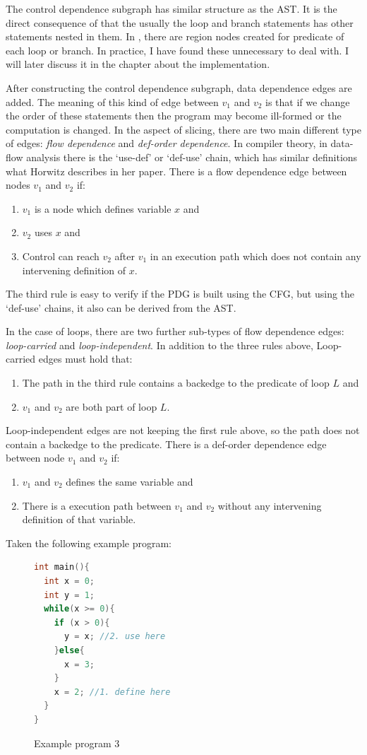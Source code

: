 \documentclass[oneside,12pt,a4paper]{book}
\begin{document}
The control dependence subgraph has similar structure as the AST. It is the direct consequence of that the usually the loop and branch statements has other statements nested in them. In \cite{efficient-pdg}, there are region nodes created for predicate of each loop or branch. In practice, I have found these unnecessary to deal with. I will later discuss it in the chapter about the implementation. 

After constructing the control dependence subgraph, data dependence edges are added. The meaning of this kind of edge between $v_1$ and $v_2$ is that if we change the order of these statements then the program may become ill-formed or the computation is changed. In the aspect of slicing, there are two main different type of edges: \textit{flow dependence} and \textit{def-order dependence}. In compiler theory, in data-flow analysis there is the `use-def' or `def-use' chain, which has similar definitions what Horwitz describes in her paper. There is a flow dependence edge between nodes $v_1$ and $v_2$ if:
\begin{enumerate}
\item $v_1$ is a node which defines variable $x$ and
\item $v_2$ uses $x$ and
\item Control can reach $v_2$ after $v_1$ in an execution path which does not contain any intervening definition of $x$.
\end{enumerate}

The third rule is easy to verify if the PDG is built using the CFG, but using the `def-use' chains, it also can be derived from the AST. 

In the case of loops, there are two further sub-types of flow dependence edges: \textit{loop-carried} and \textit{loop-independent}. In addition to the three rules above, Loop-carried edges must hold that:
\begin{enumerate}
\item The path in the third rule contains a backedge to the predicate of loop $L$ and
\item $v_1$ and $v_2$ are both part of loop $L$.
\end{enumerate}

Loop-independent edges are not keeping the first rule above, so the path does not contain a backedge to the predicate.
There is a def-order dependence edge between node $v_1$ and $v_2$ if:
\begin{enumerate}
\item $v_1$ and $v_2$ defines the same variable and
\item There is a execution path between $v_1$ and $v_2$ without any intervening definition of that variable.
\end{enumerate}
\clearpage
Taken the following example program:
\begin{figure}[h]
\lstset{numbers=left}
\begin{lstlisting}[language=C++]
int main(){
  int x = 0;
  int y = 1;
  while(x >= 0){
    if (x > 0){
      y = x; //2. use here
    }else{
      x = 3;
    }
    x = 2; //1. define here
  }
}
\end{lstlisting}
\caption{Example program 3}
\label{fig:example_prog_3}
\end{figure}
\end{document}
